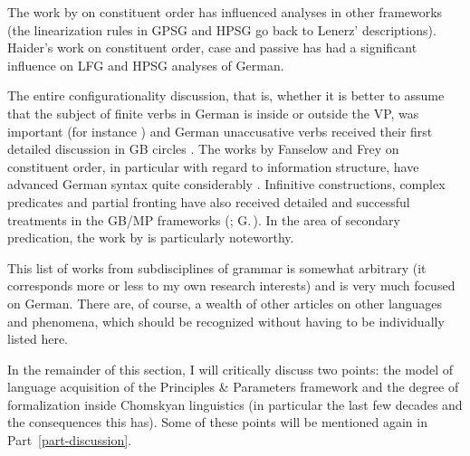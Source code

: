 The work by \citet{Lenerz77} on constituent order has influenced analyses in other frameworks
(the linearization rules in GPSG and HPSG go back to Lenerz' descriptions). Hai\-der's work on constituent order,
case and passive \citeyearpar{Haider84b,Haider85,Haider85b,Haider86,Haider90a,Haider93a} has had a significant influence on LFG
and HPSG analyses of German.

The entire configurationality discussion, that is, whether it is better to assume that the 
subject of finite verbs in German is inside or outside the VP, was important
(for instance \citealp*{Haider82,Grewendorf83a,Kratzer84a,Kratzer96a,Webelhuth85a,%
Sternefeld85b,%
Scherpenisse86a,%
Fanselow87a,Grewendorf88a,Duerscheid89a,Webelhuth90,%
Oppenrieder91a,%
Wilder91a,Haider93a,Grewendorf93,%
Frey93a,%
Lenerz94a,%
Meinunger2000a%
}) and German unaccusative verbs received their first detailed discussion in GB circles 
\citep{Grewendorf89a,Fanselow92}. The works by Fanselow and Frey on constituent order, in 
particular with regard to information structure, have advanced German syntax quite considerably
\citep{Fanselow88,Fanselow90,Fanselow93a,Fanselow2000a,Fanselow2001a,Fanselow2003d,Fanselow2003a,Fanselow2004a,Frey2000a-u,Frey2001a,Frey2004a,Frey2005a}.
Infinitive constructions, complex predicates and partial fronting have also received detailed and successful treatments
in the GB/MP frameworks
(\citealp{Bierwisch63,Evers75a,Haider82,Haider86c,Haider90b,Haider91,Haider93a,Grewendorf83a,Grewendorf87a,Grewendorf88a,denBesten85b,Sternefeld85b,Fanselow87a,Fanselow2002a,SS88a,BK89a}; G.\,\citealp{GMueller96a,GMueller98a,VS98a}).
In the area of secondary predication, the work by \citet{Winkler97a} is particularly noteworthy.

This list of works from subdisciplines of grammar is somewhat arbitrary (it corresponds more or less to my own
research interests) and is very much focused on German. There are, of course, a wealth of other articles on other
languages and phenomena, which should be recognized without having to be individually listed here.

In the remainder of this section, I will critically discuss two points: the model of language acquisition of the Principles
\& Parameters framework and the degree of formalization inside Chomskyan linguistics (in particular the last few decades
and the consequences this has). Some of these points will be mentioned again in Part~\ref{part-discussion}. 

